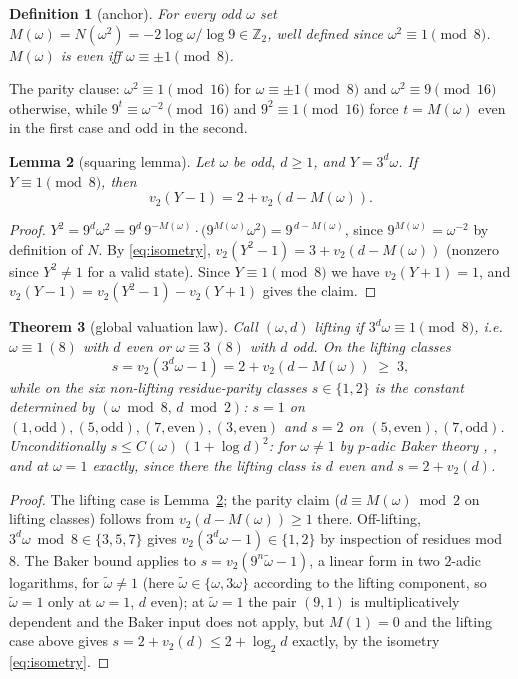 \documentclass[11pt]{article}
\newtheorem{theorem}{Theorem}[section]
\newtheorem{lemma}[theorem]{Lemma}
\newtheorem{definition}[theorem]{Definition}
\theoremstyle{remark}
\newcommand{\Z}{\mathbb{Z}}
\newcommand{\vt}[1]{v_2\!\left(#1\right)}
\newcommand{\w}{\omega}
\begin{document}
\begin{definition}[anchor]\label{def:anchor}
For every odd $\w$ set $M(\w) = N(\w^2) = -2\log\w/\log 9 \in \Z_2$, well defined since $\w^2\equiv 1 \pmod 8$. $M(\w)$ is even iff $\w\equiv\pm1\pmod 8$.
\end{definition}

The parity clause: $\w^2 \equiv 1 \pmod{16}$ for $\w \equiv \pm 1 \pmod 8$ and $\w^2 \equiv 9 \pmod{16}$ otherwise, while $9^t \equiv \w^{-2} \pmod{16}$ and $9^2 \equiv 1 \pmod{16}$ force $t = M(\w)$ even in the first case and odd in the second.

\begin{lemma}[squaring lemma]\label{lem:squaring}
Let $\w$ be odd, $d \ge 1$, and $Y = 3^d\w$. If $Y \equiv 1 \pmod 8$, then
\[ \vt{Y - 1} = 2 + \vt{d - M(\w)}. \]
\end{lemma}

\begin{proof}
$Y^2 = 9^d\w^2 = 9^{d}\,9^{-M(\w)}\cdot\bigl(9^{M(\w)}\w^2\bigr) = 9^{\,d - M(\w)}$, since $9^{M(\w)} = \w^{-2}$ by definition of $N$. By \eqref{eq:isometry}, $\vt{Y^2 - 1} = 3 + \vt{d - M(\w)}$ (nonzero since $Y^2 \neq 1$ for a valid state). Since $Y \equiv 1 \pmod 8$ we have $\vt{Y+1} = 1$, and $\vt{Y-1} = \vt{Y^2-1} - \vt{Y+1}$ gives the claim.
\end{proof}

\begin{theorem}[global valuation law]\label{thm:vlaw}
Call $(\w,d)$ \emph{lifting} if $3^d\w \equiv 1 \pmod 8$, i.e.\ $\w\equiv1\ (8)$ with $d$ even or $\w\equiv3\ (8)$ with $d$ odd. On the lifting classes
\[ s = \vt{3^d\w - 1} = 2 + \vt{d - M(\w)} \;\ge\; 3, \]
while on the six non-lifting residue-parity classes $s \in \{1,2\}$ is the constant determined by $(\w \bmod 8,\, d \bmod 2)$: $s = 1$ on $(1,\mathrm{odd}), (5,\mathrm{odd}), (7,\mathrm{even}), (3,\mathrm{even})$ and $s = 2$ on $(5,\mathrm{even}), (7,\mathrm{odd})$. Unconditionally $s \le C(\w)\,(1 + \log d)^2$: for $\w \ne 1$ by $p$-adic Baker theory \cite{yu}, \cite[Corollaire~2]{bl}, and at $\w = 1$ exactly, since there the lifting class is $d$ even and $s = 2 + \vt{d}$.
\end{theorem}

\begin{proof}
The lifting case is Lemma~\ref{lem:squaring}; the parity claim ($d \equiv M(\w) \bmod 2$ on lifting classes) follows from $\vt{d - M(\w)} \ge 1$ there. Off-lifting, $3^d\w \bmod 8 \in \{3,5,7\}$ gives $\vt{3^d\w - 1} \in \{1,2\}$ by inspection of residues mod $8$. The Baker bound applies to $s = \vt{9^n\tilde\w - 1}$, a linear form in two $2$-adic logarithms, for $\tilde\w \ne 1$ (here $\tilde\w \in \{\w, 3\w\}$ according to the lifting component, so $\tilde\w = 1$ only at $\w = 1$, $d$ even); at $\tilde\w = 1$ the pair $(9,1)$ is multiplicatively dependent and the Baker input does not apply, but $M(1) = 0$ and the lifting case above gives $s = 2 + \vt{d} \le 2 + \log_2 d$ exactly, by the isometry \eqref{eq:isometry}.
\end{proof}
\end{document}
